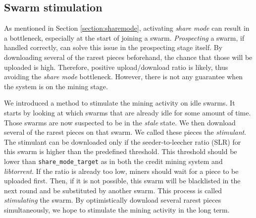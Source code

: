 \subsection{Swarm stimulation}
\label{section:swarmstimulate}
As mentioned in Section \ref{section:sharemode}, activating \textit{share mode} can result in a bottleneck, especially at the start of joining a swarm. \textit{Prospecting} a swarm, if handled correctly, can solve this issue in the prospecting stage itself. By downloading several of the rarest pieces beforehand, the chance that those will be uploaded is high. Therefore, positive upload/download ratio is likely, thus avoiding the \textit{share mode} bottleneck. However, there is not any guarantee when the system is on the mining stage.

We introduced a method to stimulate the mining activity on idle swarms. It starts by looking at which swarms that are already idle for some amount of time. Those swarms are now suspected to be in the \textit{stale} state. We then download several of the rarest pieces on that swarm. We called these pieces the \textit{stimulant}. The stimulant can be downloaded only if the seeder-to-leecher ratio (SLR) for this swarm is higher than the predefined threshold. This threshold should be lower than \texttt{share\_mode\_target} as in both the credit mining system and \textit{libtorrent}. If the ratio is already too low, miners should wait for a piece to be uploaded first. Then, if it is not possible, this swarm will be blacklisted in the next round and be substituted by another swarm. This process is called \textit{stimulating} the swarm. By optimistically download several rarest pieces simultaneously, we hope to stimulate the mining activity in the long term.